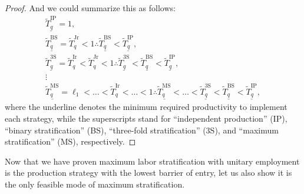 \documentclass[hidelinks, nonatbib]{elsarticle}
\begin{document}
\begin{lemma}
\begin{proof}
        And we could summarize this as follows:
        \begin{gather}
            \underline{\tilde{T}_{q}^{\text{IP}}}
            = 
            1
            ,
            \\
            \underline{\tilde{T}_{q}^{\text{BS}}}
            = 
            \tilde{T}_{q}^{\text{Jr}}
            <
            1
            \therefore
            \underline{\tilde{T}_{q}^{\text{BS}}}
            <
            \underline{\tilde{T}_{q}^{\text{IP}}}
            ,
            \\
            \underline{\tilde{T}_{q}^{\text{3S}}}
            = 
            \tilde{T}_{q}^{\text{Ir}}
            <
            \tilde{T}_{q}^{\text{Jr}}
            <
            1
            \therefore
            \underline{\tilde{T}_{q}^{\text{3S}}}
            <
            \underline{\tilde{T}_{q}^{\text{BS}}}
            <
            \underline{\tilde{T}_{q}^{\text{IP}}}
            ,
            \\
            \vdots
            \\
            \underline{\tilde{T}_{q}^{\text{MS}}}
            = 
            \ell_1
            <
            \dots
            <
            \tilde{T}_{q}^{\text{Ir}}
            <
            \dots
            <
            1
            \therefore
            \underline{\tilde{T}_{q}^{\text{MS}}}
            <
            \dots
            <
            \underline{\tilde{T}_{q}^{\text{3S}}}
            <
            \underline{\tilde{T}_{q}^{\text{BS}}}
            <
            \underline{\tilde{T}_{q}^{\text{IP}}}
            ,
        \end{gather}
        where the underline denotes the minimum required productivity to implement each strategy, while the superscripts stand for ``independent production'' (IP), ``binary stratification'' (BS), ``three-fold stratification'' (3S), and ``maximum stratification'' (MS), respectively.
    \end{proof}
\end{lemma}

Now that we have proven maximum labor stratification with unitary employment is the production strategy with the lowest barrier of entry, let us also show it is the only feasible mode of maximum stratification.
\end{document}
